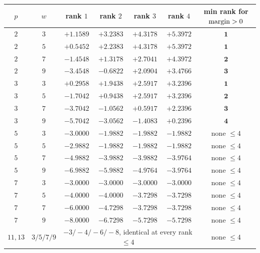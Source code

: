 \begin{finding}\label{find:map3}
\begin{center}
\tabsmall
\begin{tabular}{cccccc|c}
\toprule
$p$ & $w$ & rank $1$ & rank $2$ & rank $3$ & rank $4$ & min rank for $\operatorname{margin}>0$\\
\midrule
$2$ & $3$ & $+1.1589$ & $+3.2383$ & $+4.3178$ & $+5.3972$ & $\mathbf1$\\
$2$ & $5$ & $+0.5452$ & $+2.2383$ & $+4.3178$ & $+5.3972$ & $\mathbf1$\\
$2$ & $7$ & $-1.4548$ & $\mathbf{+1.3178}$ & $+2.7041$ & $+4.3972$ & $\mathbf2$\\
$2$ & $9$ & $-3.4548$ & $-0.6822$ & $\mathbf{+2.0904}$ & $+3.4766$ & $\mathbf3$\\
\midrule
$3$ & $3$ & $+0.2958$ & $+1.9438$ & $+2.5917$ & $+3.2396$ & $\mathbf1$\\
$3$ & $5$ & $-1.7042$ & $\mathbf{+0.9438}$ & $+2.5917$ & $+3.2396$ & $\mathbf2$\\
$3$ & $7$ & $-3.7042$ & $-1.0562$ & $\mathbf{+0.5917}$ & $+2.2396$ & $\mathbf3$\\
$3$ & $9$ & $-5.7042$ & $-3.0562$ & $-1.4083$ & $\mathbf{+0.2396}$ & $\mathbf4$\\
\midrule
$5$ & $3$ & $-3.0000$ & $-1.9882$ & $-1.9882$ & $-1.9882$ & none $\le4$\\
$5$ & $5$ & $-2.9882$ & $-1.9882$ & $-1.9882$ & $-1.9882$ & none $\le4$\\
$5$ & $7$ & $-4.9882$ & $-3.9882$ & $-3.9882$ & $-3.9764$ & none $\le4$\\
$5$ & $9$ & $-6.9882$ & $-5.9882$ & $-4.9764$ & $-3.9764$ & none $\le4$\\
\midrule
$7$ & $3$ & $-3.0000$ & $-3.0000$ & $-3.0000$ & $-3.0000$ & none $\le4$\\
$7$ & $5$ & $-4.0000$ & $-4.0000$ & $-3.7298$ & $-3.7298$ & none $\le4$\\
$7$ & $7$ & $-6.0000$ & $-4.7298$ & $-3.7298$ & $-3.7298$ & none $\le4$\\
$7$ & $9$ & $-8.0000$ & $-6.7298$ & $-5.7298$ & $-5.7298$ & none $\le4$\\
\midrule
$11,13$ & $3/5/7/9$ & \multicolumn{4}{c|}{$-3/-4/-6/-8$, identical at every rank $\le4$} & none $\le4$\\
\bottomrule
\end{tabular}
\end{center}
\end{finding}

